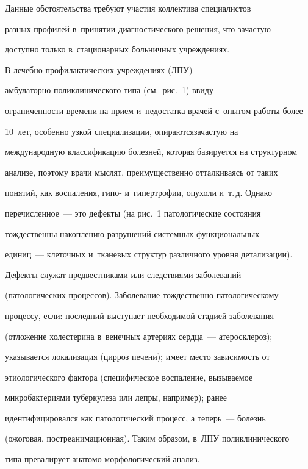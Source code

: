  Данные обстоятельства требуют участия коллектива специалистов 

разных профилей в~принятии диагностического решения, что зачастую 

доступно только в~стационарных больничных учреждениях.

  

  В лечебно-профилактических учреждениях (ЛПУ)  

ам\-бу\-ла\-тор\-но-по\-ли\-кли\-ни\-че\-ско\-го типа (см.\ рис.~1) ввиду 

ограниченности времени на прием и~недостатка врачей с~опытом работы более 

10~лет, особенно узкой специализации, опираются\linebreak зачастую на 

международную классификацию болезней, которая базируется на структурном 

анализе, поэтому врачи мыс\-лят, преимущественно отталкиваясь от таких 

понятий, как воспаления, гипо- и~гипертрофии, опухоли и~т.\,д. Однако 

перечисленное~--- это дефекты (на рис.~1 патологические состояния 

тождественны накоплению разрушений сис\-тем\-ных функциональных  

единиц~--- клеточных и~тканевых структур различного уровня детализации). 

Дефекты служат предвестниками или следствиями заболеваний 

(патологических процессов). Заболевание тождественно патологическому 

процессу, если: последний выступает необходимой стадией заболевания 

(отложение холестерина в~венечных артериях сердца~--- атеросклероз); 

указывается локализация (цирроз печени); имеет место зависимость от 

этиологического фактора (специфическое воспаление, вызываемое 

микробактериями туберкулеза или лепры, например); ранее 

идентифицировался как патологический процесс, а теперь~--- болезнь 

(ожоговая, постреанимационная). Таким образом, в~ЛПУ поликлинического 

типа превалирует ана\-то\-мо-мор\-фо\-ло\-ги\-че\-ский анализ. 


